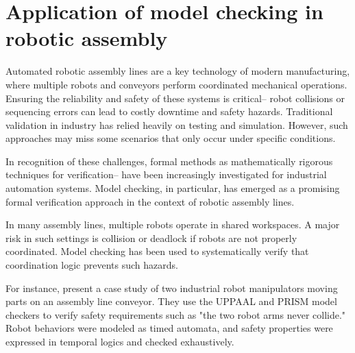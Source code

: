 \section{Application of model checking in robotic assembly}

Automated robotic assembly lines are a key technology of modern manufacturing, 
where multiple robots and conveyors perform coordinated mechanical 
operations. Ensuring the reliability and safety of these systems is 
critical--  robot collisions or sequencing errors can lead 
to costly downtime and safety hazards.
Traditional validation in industry has relied heavily on %
testing and simulation. However, such approaches may miss some
scenarios that only occur under specific conditions\cite{Ozkan2023}.

In recognition of these challenges, formal methods as mathematically rigorous 
techniques for  verification-- have been increasingly investigated 
for industrial automation systems\cite{Sinha2019,Luckcuck2019}. 
Model checking, in particular, has emerged as a promising formal 
verification approach in the context of robotic assembly lines. 

%

In many assembly lines, multiple robots operate in shared workspaces. 
A major risk in such settings is collision or deadlock if robots are 
not properly coordinated. Model checking has been used to systematically verify 
that coordination logic prevents such hazards\cite{Ozkan2023}.

For instance, \cite{Ozkan2023} present a case study of two industrial robot 
manipulators moving parts on an assembly line conveyor. They use the 
UPPAAL and PRISM model checkers to verify safety requirements such as 
"the two robot arms never collide." Robot behaviors were modeled as 
timed automata, and safety properties were expressed in temporal logics 
and checked exhaustively.

